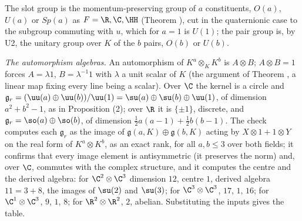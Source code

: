 The slot group is the momentum-preserving group of $a$ constituents, $O(a)$, $U(a)$ or $Sp(a)$ as $F = \R, \C, \HH$ (Theorem ), cut in the quaternionic case to the subgroup commuting with $u$, which for $a = 1$ is $U(1)$; the pair group is, by U2, the unitary group over $K$ of the $b$ pairs, $O(b)$ or $U(b)$.

\emph{The automorphism algebras.}  An automorphism of $K^{a} \otimes_{K} K^{b}$ is $A \otimes B$; $A \otimes B = 1$ forces $A = \lambda 1$, $B = \lambda^{-1}1$ with $\lambda$ a unit scalar of $K$ (the argument of Theorem , a linear map fixing every line being a scalar). Over $\C$ the kernel is a circle and $\mathfrak{g}_{r} = (\uu(a) \oplus \uu(b))/\uu(1) = \su(a) \oplus \su(b) \oplus \uu(1)$, of dimension $a^{2} + b^{2} - 1$, as in Proposition (2); over $\R$ it is $\{\pm 1\}$, discrete, and $\mathfrak{g}_{r} = \so(a) \oplus \so(b)$, of dimension $\tfrac12 a(a-1) + \tfrac12 b(b-1)$. The check computes each $\mathfrak{g}_{r}$ as the image of $\mathfrak{g}(a, K) \oplus \mathfrak{g}(b, K)$ acting by $X \otimes 1 + 1 \otimes Y$ on the real form of $K^{a} \otimes K^{b}$, as an exact rank, for all $a, b \le 3$ over both fields; it confirms that every image element is antisymmetric (it preserves the norm) and, over $\C$, commutes with the complex structure, and it computes the centre and the derived algebra: for $\C^{2} \otimes \C^{3}$ dimension $12$, centre $1$, derived algebra $11 = 3 + 8$, the images of $\su(2)$ and $\su(3)$; for $\C^{3} \otimes \C^{3}$, $17$, $1$, $16$; for $\C^{1} \otimes \C^{3}$, $9$, $1$, $8$; for $\R^{2} \otimes \R^{2}$, $2$, abelian. Substituting the inputs gives the table.

